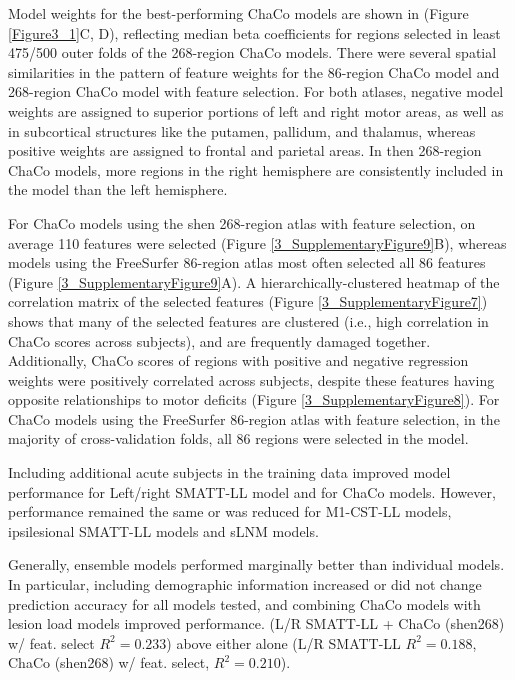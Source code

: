 \documentclass[phd,tocprelim]{cornell}
\begin{document}
Model weights for the best-performing ChaCo models are shown in (Figure \ref{Figure3_1}C, D), reflecting median beta coefficients for regions selected in least 475/500 outer folds of the 268-region ChaCo models. There were several spatial similarities in the pattern of feature weights for the 86-region ChaCo model and 268-region ChaCo model with feature selection. For both atlases, negative model weights are assigned to superior portions of left and right motor areas, as well as in subcortical structures like the putamen, pallidum, and thalamus, whereas positive weights are assigned to frontal and parietal areas. In then 268-region ChaCo models, more regions in the right hemisphere are consistently included in the model than the left hemisphere. 



For ChaCo models using the shen 268-region atlas with feature selection, on average 110 features were selected (Figure \ref{3_SupplementaryFigure9}B), whereas models using the FreeSurfer 86-region atlas most often selected all 86 features (Figure \ref{3_SupplementaryFigure9}A).  A hierarchically-clustered heatmap of the correlation matrix of the selected features (Figure \ref{3_SupplementaryFigure7}) shows that many of the selected features are clustered (i.e., high correlation in ChaCo scores across subjects), and are frequently damaged together. Additionally, ChaCo scores of regions with positive and negative regression weights were positively correlated across subjects, despite these features having opposite relationships to motor deficits (Figure \ref{3_SupplementaryFigure8}). For ChaCo models using the FreeSurfer 86-region atlas with feature selection, in the majority of cross-validation folds, all 86 regions were selected in the model. 

Including additional acute subjects in the training data improved model performance for Left/right SMATT-LL model and for ChaCo models. However, performance remained the same or was reduced for M1-CST-LL models, ipsilesional SMATT-LL models and sLNM models.

Generally, ensemble models performed marginally better than individual models. In particular, including demographic information increased or did not change prediction accuracy for all models tested, and combining ChaCo models with lesion load models improved performance. (L/R SMATT-LL + ChaCo (shen268) w/ feat. select $R^2 = 0.233$) above either alone (L/R SMATT-LL $R^2=0.188$, ChaCo (shen268) w/ feat. select, $R^2=0.210$).\\
\end{document}
